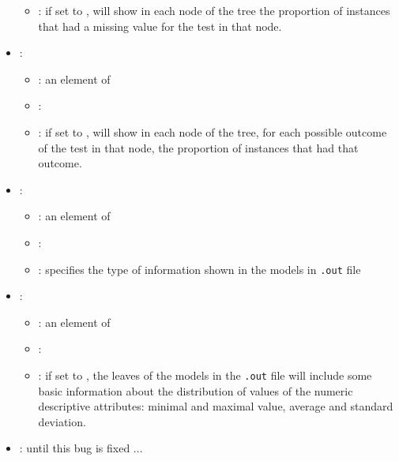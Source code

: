 \begin{itemize}
\begin{itemize}
                \item \optionDescrption{}: if set to , \clus{} will show in each node of the tree the proportion of instances that had a missing value for the test in that node.
           \end{itemize}
    \item {}:
           \begin{itemize}
                \item \optionPossibleValues{}: an element of 
                \item \optionDefaultValue{}: 
                \item \optionDescrption{}:  if set to , \clus{} will show in each node of the tree, for each possible outcome of the test in that node, the proportion of instances that had that outcome.
           \end{itemize}
    \item {}:
           \begin{itemize}
                \item \optionPossibleValues{}: an element of 
                \item \optionDefaultValue{}: 
                \item \optionDescrption{}: specifies the type of information shown in the models in \texttt{.out} file
           \end{itemize}
    \item {}:
           \begin{itemize}
                \item \optionPossibleValues{}: an element of  
                \item \optionDefaultValue{}: 
                \item \optionDescrption{}: if set to , the leaves of the models in the \texttt{.out} file will include some basic information about the distribution of values of the numeric
                descriptive attributes: minimal and maximal value, average and standard deviation.
           \end{itemize}
    \item {}: until this bug is fixed ...

\end{itemize}
